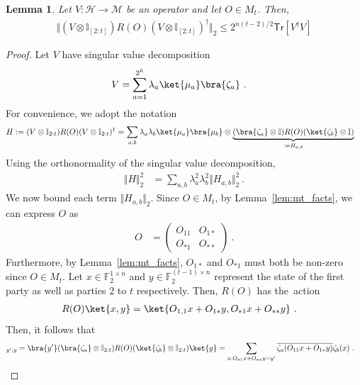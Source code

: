 \documentclass[11pt]{article}
\newtheorem{lemma}[theorem]{Lemma}
\newcommand{\id}{\ensuremath{\mathbb{I}}}
\newcommand{\Tr}{\mathsf{Tr}}
\newcommand{\F}{\mathbb{F}}
\newcommand{\Hc}{\mathcal{H}}
\newcommand{\Mc}{\mathcal{M}}
\begin{document}
\begin{lemma}\label{lem:cut_rank}
    Let $V:\Hc\rightarrow\Mc$ be an operator and let $O\in M_t$. Then,
    \begin{align}
        \Vert (V\otimes \id_{[2:t]}) R(O)(V \otimes \id_{[2:t]})^\dagger \Vert_2 \leq 2^{n(t-2)/2}\Tr[V^\dagger V]
    \end{align}
\end{lemma}
\begin{proof}
    Let $V$ have singular value decomposition
    \begin{align}
        V & = \sum_{a=1}^{2^k} \lambda_a \ket{\mu_a}\bra{\zeta_a}\ .
    \end{align}
    For convenience, we adopt the notation
    \begin{align}
        H & : = (V\otimes \id_{2:t}) R(O) (V\otimes \id_{2:t})^\dagger = \sum_{a,b} \lambda_a \lambda_b \ket{\mu_a}\bra{\mu_b}\otimes \underbrace{(\bra{\zeta_a}\otimes \id)R(O)(\ket{\zeta_b}\otimes \id)}_{:=H_{a,b}}
    \end{align}
    Using the orthonormality of the singular value decomposition,
    \begin{align}
        \Vert H \Vert_2^2 & = \sum_{a,b}\lambda_a^2 \lambda_b^2 \Vert H_{a,b}\Vert_2^2\ .
    \end{align}
    We now bound each term $\Vert H_{a,b}\Vert_2$. Since $O\in M_t$, by Lemma~\ref{lem:mt_facts}, we can express $O$ as 
    \begin{align}
        O & = \begin{pmatrix}
            O_{11} & O_{1*} \\
            O_{*1} & O_{**}
        \end{pmatrix}\ .
    \end{align}
    Furthermore, by Lemma~\ref{lem:mt_facts}, $O_{1*}$ and $O_{*1}$ must both be non-zero since $O\in M_t$. Let $x\in \F_2^{1\times n}$ and $y\in \F_2^{(t-1)\times n}$ represent the state of the first party as well as parties $2$ to $t$ respectively. Then, $R(O)$ has the~action
    \begin{align}
        R(O)\ket{x,y} & = \ket{O_{1,1}x+O_{1*}y, O_{*1}x+O_{**}y}\ .
    \end{align}
    Then, it follows that
    \begin{align}
        [H_{a,b}]_{y',y} = \bra{y'}(\bra{\zeta_a}\otimes \id_{2:t})R(O)(\ket{\zeta_b}\otimes \id_{2:t})\ket{y} & = \sum_{x: O_{*1}x+O_{**}y = y'} \overline{\zeta_a(O_{11}x+O_{1*}y)}\zeta_b(x) \ .
    \end{align}

\end{proof}
\end{document}
